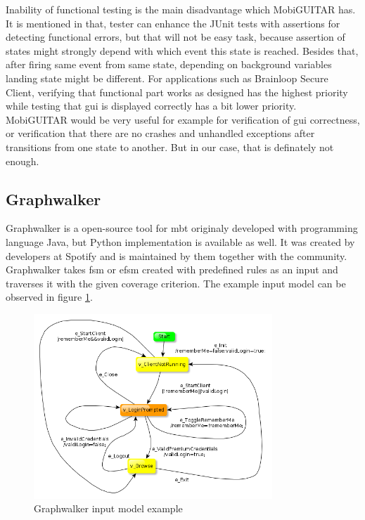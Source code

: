 \par
Inability of functional testing is the main disadvantage which MobiGUITAR has. It is mentioned in \cite{MobiGUITAR} that, tester can enhance the JUnit tests with assertions for detecting functional errors, but that will not be easy task, because assertion of states might strongly depend with which event this state is reached. Besides that, after firing same event from same state, depending on background variables landing state might be different. For applications such as Brainloop Secure Client, verifying that functional part works as designed has the highest priority while testing that \acrshort{gui} is displayed correctly has a bit lower priority. MobiGUITAR would be very useful for example for verification of \acrshort{gui} correctness, or verification that there are no crashes and unhandled exceptions after transitions from one state to another. But in our case, that is definately not enough.

\subsection{Graphwalker}
\par
Graphwalker \cite{Graphwalker_Description} is a open-source tool for \acrshort{mbt} originaly developed with programming language Java, but Python implementation is available as well. It was created by developers at Spotify \cite{Spotify} and is maintained by them together with the community. Graphwalker takes \acrshort{fsm} or \acrshort{efsm} created with predefined rules as an input and traverses it with the given coverage criterion.
The example input model can be observed in figure \ref{Fig:Graphwalker_model_example}.

\begin{figure} [htbp!]
	\centering
					\includegraphics[width=0.8\textwidth]{figures/Graphwalker_model_example.png}
					\caption{\label{Fig:Graphwalker_model_example} Graphwalker input model example \cite{Graphwalker_Login_Example}}
\end{figure}

